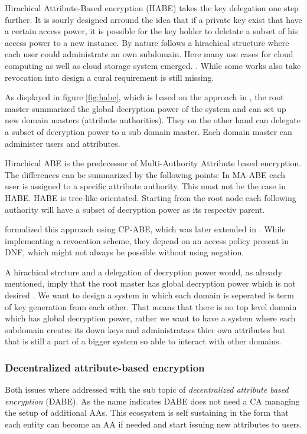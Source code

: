 Hirachical Attribute-Based encryption (HABE) takes the key delegation one step further. It is sourly designed arround the idea that if a private key exist that have a certain access power, it is possible for the key holder to deletate a subset of his access power to a new instance. By nature follows a hirachical structure where each user could administrate an own subdomain. Here many use cases for cloud computing as well as cloud storage system emerged. \cite{Wang:2010:HAE:1866307.1866414}. While some works also take revocation into design a cural requirement is still missing.

As displayed in figure \ref{fig:habe}, which is based on the approach in \cite{wang2011hierarchical}, the root master summarized the global decryption power of the system and can set up new domain masters (attribute authorities). They on the other hand can delegate a subset of decryption power to a sub domain master. Each domain master can administer users and attributes.

Hirachical ABE is the predecessor of Multi-Authority Attribute based encryption. The differences can be summarized by the following points: In MA-ABE each user is assigned to a specific attribute authority. This must not be the case in HABE. HABE is tree-like orientated. Starting from the root node each following authority will have a subset of decryption power as its respectiv parent. 

\cite{Wang:2010:HAE:1866307.1866414} formalized this approach using CP-ABE, which was later extended in \cite{wang2011hierarchical}. While implementing a revocation scheme, they depend on an access policy present in DNF, which might not always be possible without using negation. 

A hirachical strcture and a delegation of decryption power would, as already mentioned, imply that the root master has global decryption power which is not desired . We want to design a system in which each domain is seperated is term of key generation from each other. That means that there is no top level domain which has global decryption power, rather we want to have a system where each subdomain creates its down keys and administrataes thier own attributes but that is still a part of a bigger system so able to interact with other domains.  

\subsubsection{Decentralized attribute-based encryption}
\label{sec:DABE}
Both issues where addressed with the sub topic of \textit{decentralized attribute based encryption} (DABE). As the name indicates DABE does not need a CA managing the setup of additional AAs. This ecosystem is self sustaining in the form that each entity can become an AA if needed and start issuing new attributes to users. 

